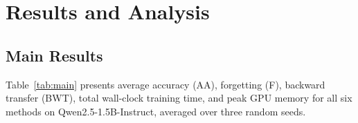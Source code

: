 
\section{Results and Analysis}
\label{sec:results}

\subsection{Main Results}

Table~\ref{tab:main} presents average accuracy (AA), forgetting (F), backward transfer (BWT),
total wall-clock training time, and peak GPU memory for all six methods on
Qwen2.5-1.5B-Instruct, averaged over three random seeds.

\begin{table}[t]
\centering
\caption{Main results on Qwen2.5-1.5B-Instruct across the SST-2\,$\to$\,MRPC\,$\to$\,CoLA\,$\to$\,MNLI
sequence. Mean\,$\pm$\,std over 3 seeds. $\uparrow$ = higher is better; $\downarrow$ = lower is
better.}
\label{tab:main}
\end{table}

